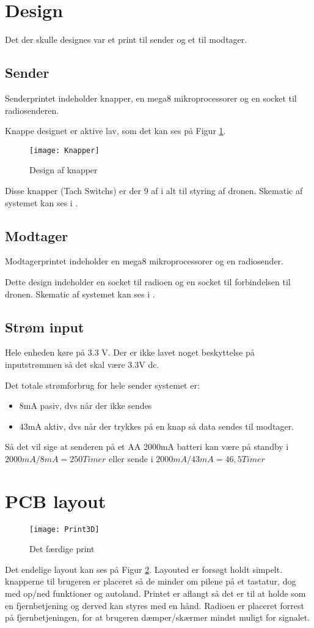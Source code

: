 \documentclass[Main]{subfiles}
\begin{document}
\section{Design}
Det der skulle designes var
et print til sender og et til modtager.

\subsection{Sender}
Senderprintet indeholder knapper, en mega8 mikroprocessorer og en socket til radiosenderen.

Knappe designet er aktive lav, som det kan ses på Figur \ref{fig: Knapper}.


\begin{figure}[H]
\centering
\texttt{[image: Knapper]}
\caption{Design af knapper}
\label{fig: Knapper}
\end{figure}

Disse knapper (Tach Switchs) er der 9 af i alt til styring af dronen.
Skematic af systemet kan ses i \cite{SenderSCM}.
\subsection{Modtager}
Modtagerprintet indeholder en mega8 mikroprocessorer og en radiosender.

Dette design indeholder en socket til radioen og en socket til \itoc forbindelsen til dronen.
Skematic af systemet kan ses i \cite{ModtagerSCM}.


\subsection{Strøm input}

Hele enheden køre på 3.3 V.
Der er ikke lavet noget beskyttelse på inputstrømmen så det skal være 3.3V dc.

Det totale strømforbrug for hele sender systemet er:
\begin{itemize}
\item 8mA pasiv, dvs når der ikke sendes
\item 43mA aktiv, dvs når der trykkes på en knap så data sendes til modtager.
\end{itemize}

Så det vil sige at senderen på et AA 2000mA batteri kan være på standby i $2000mA/8mA = 250 Timer$ eller sende i $2000mA/43mA = 46,5 Timer$


\section{PCB layout}

\begin{figure}[H]
\centering
\texttt{[image: Print3D]}
\caption{Det færdige print}
\label{fig: Print3D}
\end{figure}
Det endelige layout kan ses på Figur \ref{fig: Print3D}.
Layouted er forsøgt holdt simpelt. knapperne til brugeren er placeret så de minder om pilene på et tastatur, dog med op/ned funktioner og autoland.
Printet er aflangt så det er til at holde som en fjernbetjening og derved kan styres med en hånd.
Radioen er placeret forrest på fjernbetjeningen, for at brugeren dæmper/skærmer mindst muligt for signalet.  
\end{document}
